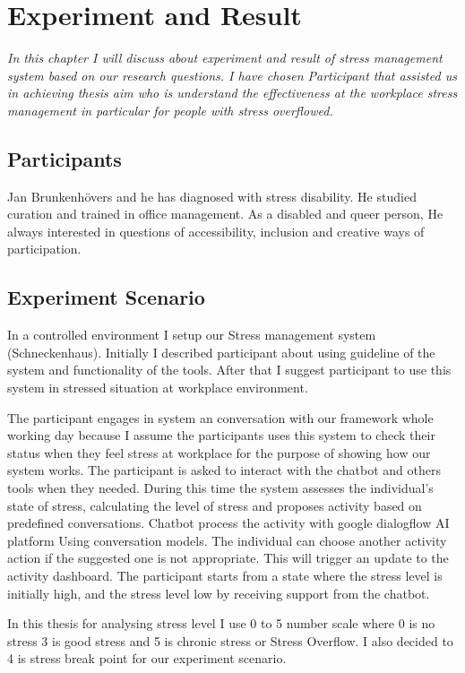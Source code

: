\chapter{Experiment and Result}
\textit{In this chapter I will discuss about experiment and result of  stress management system based on our research questions. I have chosen Participant  that  assisted  us  in  achieving  thesis aim who is understand the  effectiveness  at  the  workplace stress management  in  particular  for people with stress overflowed. }
\vspace{5mm}

\section{Participants}
Jan Brunkenhövers and he has diagnosed with stress disability. He studied curation and trained in office management. As a disabled and queer person, He always interested in questions of accessibility, inclusion and creative ways of participation.

\section{Experiment Scenario}
In a controlled environment I setup our Stress management system (Schneckenhaus). Initially I described participant about using guideline of the system and functionality of the tools. After that I suggest participant to use this system in stressed situation at workplace environment. 

The participant engages in system an conversation with our framework whole working day because I assume the participants uses this system to check their status when they feel stress at workplace for the purpose of showing how our system works. The participant is asked to interact with the chatbot and others tools when they needed. During this time the system assesses the individual's state of stress, calculating the level of stress and proposes activity based on predefined  conversations. Chatbot process the activity with google dialogflow \acs{AI} platform Using conversation models. The individual can choose another activity action if the suggested one is not appropriate. This will trigger an update to the activity dashboard. The participant starts from a state where the stress level is initially high, and the stress level low by receiving support from the chatbot.

In this thesis for analysing stress level I use 0 to 5 number scale where 0 is no stress 3 is good stress and 5 is chronic stress or Stress Overflow. I also decided to 4 is stress break point for our experiment scenario.
